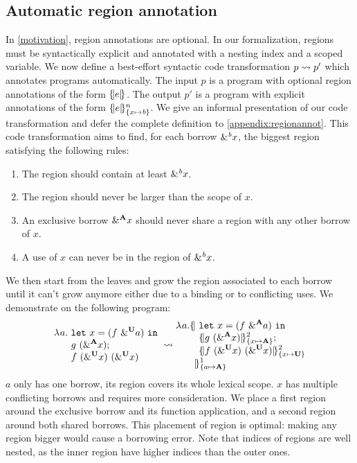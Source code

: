 
\subsection{Automatic region annotation}
\label{regionannot}

In \cref{motivation}, region annotations are optional.
In our formalization, regions must be syntactically explicit and annotated with
a nesting index and a scoped variable.
We now define a best-effort
syntactic code transformation $\RannotT{p}{p'}$ which
annotates programs automatically.
The input $p$ is a program with optional region annotations of the form $\region[]{}{e}$.
The output $p'$ is a program with explicit annotations
of the form $\region{\Sone x\BORROW}{e}$.
We give an informal presentation of our code transformation and defer
the complete definition to \cref{appendix:regionannot}. This code transformation
aims to find, for each borrow $\borrow{x}$, the biggest region satisfying
the following rules:
\begin{enumerate}
\item The region should contain at least $\borrow{x}$.
\item The region should never be larger than the scope of $x$.
\item An exclusive borrow $\borrow[\kaff]{x}$ should never share a region with any other borrow of $x$.
\item A use of $x$ can never be in the region of $\borrow{x}$.
\end{enumerate}
We then start from the leaves and grow the region
associated to each borrow until it can't grow anymore either due to a binding
or to conflicting uses. We demonstrate
on the following program:
%
\[
  \setlength{\jot}{-1pt}
  \RannotT{
\begin{aligned}
  \lam{a}{}\ &
  \letin{x}{\app{f}{\borrow[\kun]{a}}}{}\\
  &g\ (\borrow[\kaff]{x});\\
  &f\ (\borrow[\kun]{x})\ (\borrow[\kun]{x})\\
\end{aligned}
}{
\begin{aligned}
  \lam{a}{}\region[1]{\Sone a\MBORROW}{\ &%
  \letin{x}{\app{f}{\borrow[\kaff]{a}}}{}\\
  &\region[2]{\Sone x\MBORROW}{g\ (\borrow[\kaff]{x})};\\
  &\region[2]{\Sone x\IBORROW}{f\ (\borrow[\kun]{x})\ (\borrow[\kun]{x})}\\
  &\!\!\!}
\end{aligned}
}
\]
%
$a$ only has one borrow, its region covers its whole lexical scope.
$x$ has multiple conflicting borrows and requires more consideration.
We place a first
region around the exclusive borrow and its function application,
and a second region around both shared borrows. This placement of region
is optimal: making any region bigger would cause a borrowing
error.
Note that indices of regions are well nested, as the inner region have
higher indices than the outer ones.

